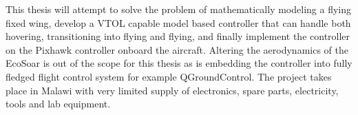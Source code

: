 This thesis will attempt to solve the problem of mathematically modeling a flying fixed wing, develop a VTOL capable model based controller that can handle both hovering, transitioning into flying and flying, and finally implement the controller on the Pixhawk controller onboard the aircraft.
Altering the aerodynamics of the EcoSoar is out of the scope for this thesis as is embedding the controller into fully fledged flight control system for example QGroundControl.
The project takes place in Malawi with very limited supply of electronics, spare parts, electricity, tools and lab equipment.


